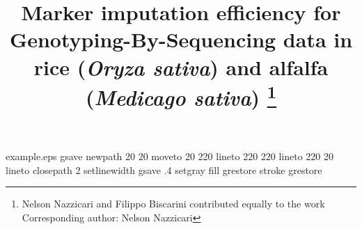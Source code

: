 %
%
%
%
%
\begin{filecontents*}{example.eps}
gsave
newpath
  20 20 moveto
  20 220 lineto
  220 220 lineto
  220 20 lineto
closepath
2 setlinewidth
gsave
  .4 setgray fill
grestore
stroke
grestore
\end{filecontents*}
%
\RequirePackage{fix-cm}
%
\documentclass[smallextended]{svjour3}       %
%
\smartqed  %
%
%
%

\usepackage{xfrac}   
\usepackage{lineno}  
\usepackage{graphicx}
\usepackage{color}
\usepackage{multirow}
\usepackage{array}
\usepackage{setspace} 
\usepackage{makecell}
\usepackage[nomarkers]{endfloat}

\newcolumntype{C}[1]{>{\centering\let\newline\\\arraybackslash\hspace{0pt}}m{#1}}

\linenumbers
\doublespacing %

%


\title{
Marker imputation efficiency for Genotyping-By-Sequencing data in rice (\emph{Oryza sativa}) and alfalfa (\emph{Medicago sativa})
\thanks{Nelson Nazzicari and Filippo Biscarini contributed equally to the work \\
Corresponding author: Nelson Nazzicari }
}

